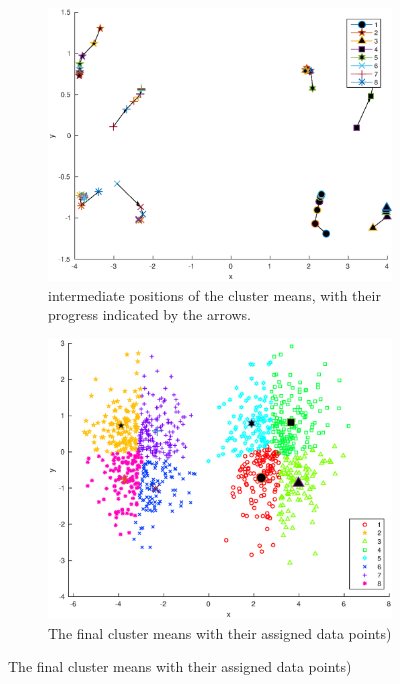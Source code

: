 \documentclass[10pt]{article}
\begin{document}
\begin{figure}[H]
  \centering
  \caption{Results for k=8}
  \begin{subfigure}[b]{.45\textwidth}
    \includegraphics[width=\columnwidth]{Fig1_k8.eps}
    \caption{intermediate positions of the cluster means, 
    with their progress indicated by the arrows.}
  \end{subfigure}
  \quad
  \begin{subfigure}[b]{.45\textwidth}
    \includegraphics[width=\columnwidth]{Fig2_k8.eps}
    \caption{The final cluster means with their assigned data points)}
  \end{subfigure}
  \label{fig1.3}
\end{figure}
\end{document}
